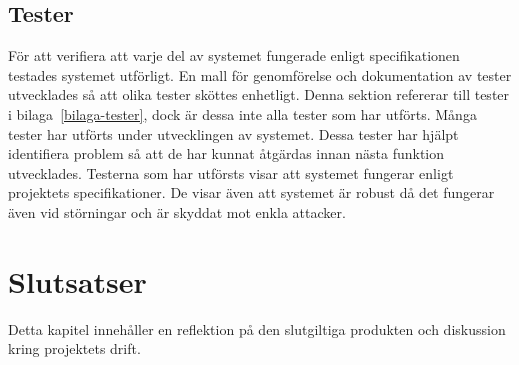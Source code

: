 \documentclass[a4paper]{article}
\begin{document}
\subsection{Tester}
För att verifiera att varje del av systemet fungerade enligt specifikationen testades systemet utförligt.
En mall för genomförelse och dokumentation av tester utvecklades så att olika tester sköttes enhetligt.
Denna sektion refererar till tester i bilaga~\ref{bilaga-tester}, dock är dessa inte alla tester som har utförts.
Många tester har utförts under utvecklingen av systemet.
Dessa tester har hjälpt identifiera problem så att de har kunnat åtgärdas innan nästa funktion utvecklades.
Testerna som har utförsts visar att systemet fungerar enligt projektets specifikationer.
De visar även att systemet är robust då det fungerar även vid störningar och är skyddat mot enkla attacker.

\section{Slutsatser}
Detta kapitel innehåller en reflektion på den slutgiltiga produkten och diskussion kring projektets drift.
\end{document}
